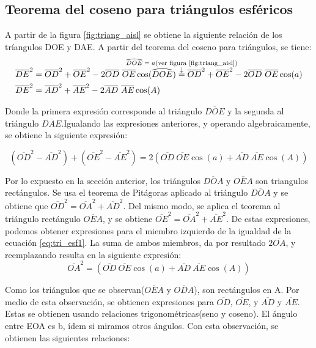\subsection{Teorema del coseno para triángulos esféricos}
A partir de la figura \ref{fig:triang_aisl} se obtiene la siguiente relación de los tríangulos DOE y DAE. A partir del teorema del coseno para triángulos, se tiene: 
\begin{align}
	\overline{DE}^2 & = \overline{OD}^2+\overline{OE}^2-2\overline{OD} \ \overline{OE} \cos(\widehat{DOE})\annoterel{$\widehat{DOE}=a$(ver figura \ref{fig:triang_aisl})}{=} \overline{OD}^2+\overline{OE}^2-2\overline{OD} \ \overline{OE} \cos(a)  \\
\overline{DE}^2 & = \overline{AD}^2+\overline{AE}^2 - 2\overline{AD} \ \overline{AE} \cos(A) 
\end{align}

Donde la primera expresión corresponde al triángulo $\overline{DOE}$ y la segunda al triángulo $\overline{DAE}$.Igualando las expresiones anteriores, y operando algebraicamente, se obtiene la siguiente expresión: 

\begin{equation} \label{eq:tri_esf1}
	(\overline{OD}^2 - \overline{AD}^2) + (\overline{OE}^2 - \overline{AE}^2) = 2(\overline{OD}\ \overline{OE}\cos(a)+ \overline{AD}\ \overline{AE}\cos(A) )
\end{equation}

Por lo expuesto en la sección anterior, los triángulos $\overline{DOA}$ y $\overline{OEA}$
son triangulos rectángulos. Se usa el teorema de Pitágoras aplicado al triángulo $\overline{DOA}$  y se obtiene que $\overline{OD}^2=\overline{OA}^2 + \overline{AD}^2$. Del mismo modo, se aplica el teorema al triángulo rectángulo $\overline{OEA}$, y se obtiene $\overline{OE}^2=\overline{OA}^2 + \overline{AE}^2$. De estas expresiones, podemos obtener expresiones para el miembro izquierdo de la igualdad de la ecuación \ref{eq:tri_esf1}. La suma de ambos miembros, da por resultado $2\overline{OA}$, y reemplazando resulta en la siguiente expresión: 
\begin{equation} \label{eq:tri2_esf}
	\overline{OA}^2 = (\overline{OD}\ \overline{OE}\cos(a)+ \overline{AD}\ \overline{AE}\cos(A) )
\end{equation}   

Como los triángulos que se observan($\overline{OEA}$ y $\overline{ODA}$), son rectángulos en A. Por medio de esta observación, se obtienen expresiones para $\overline{OD}$, $\overline{OE}$, y $\overline{AD}$ y $\overline{AE}$. Estas se obtienen usando relaciones trigonométricas(seno y coseno). El ángulo entre EOA es b, ídem si miramos otros ángulos. Con esta observación, se obtienen las siguientes relaciones:
 

